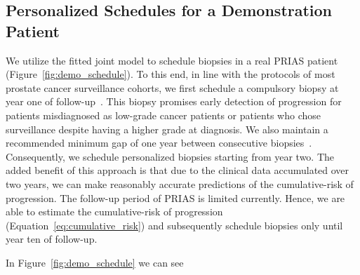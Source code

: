 \subsection{Personalized Schedules for a Demonstration Patient}
We utilize the fitted joint model to schedule biopsies in a real PRIAS patient (Figure~\ref{fig:demo_schedule}). To this end, in line with the protocols of most prostate cancer surveillance cohorts, we first schedule a compulsory biopsy at year one of follow-up~\citep{nieboer2018active}. This biopsy promises early detection of progression for patients misdiagnosed as low-grade cancer patients or patients who chose surveillance despite having a higher grade at diagnosis. We also maintain a recommended minimum gap of one year between consecutive biopsies~\citep{bokhorst2016decade}. Consequently, we schedule personalized biopsies starting from year two. The added benefit of this approach is that due to the clinical data accumulated over two years, we can make reasonably accurate predictions of the cumulative-risk of progression. The follow-up period of PRIAS is limited currently. Hence, we are able to estimate the cumulative-risk of progression (Equation~\ref{eq:cumulative_risk}) and subsequently schedule biopsies only until year ten of follow-up.

In Figure~\ref{fig:demo_schedule} we can see

